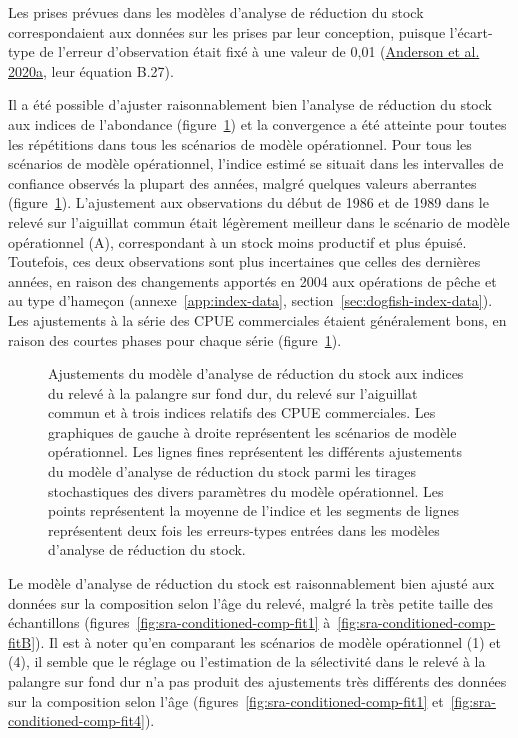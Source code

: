 \documentclass[11pt]{book}
\begin{document}
Les prises prévues dans les modèles d'analyse de réduction du stock correspondaient aux données sur les prises par leur conception, puisque l'écart-type de l'erreur d'observation était fixé à une valeur de 0,01 (\protect\hyperlink{ref-anderson2020gfmp}{Anderson et al. 2020a}, leur équation B.27).

Il a été possible d'ajuster raisonnablement bien l'analyse de réduction du stock aux indices de l'abondance (figure~\ref{fig:survey-fits}) et la convergence a été atteinte pour toutes les répétitions dans tous les scénarios de modèle opérationnel. Pour tous les scénarios de modèle opérationnel, l'indice estimé se situait dans les intervalles de confiance observés la plupart des années, malgré quelques valeurs aberrantes (figure~\ref{fig:survey-fits}). L'ajustement aux observations du début de 1986 et de 1989 dans le relevé sur l'aiguillat commun était légèrement meilleur dans le scénario de modèle opérationnel (A), correspondant à un stock moins productif et plus épuisé. Toutefois, ces deux observations sont plus incertaines que celles des dernières années, en raison des changements apportés en 2004 aux opérations de pêche et au type d'hameçon (annexe~\ref{app:index-data}, section~\ref{sec:dogfish-index-data}). Les ajustements à la série des CPUE commerciales étaient généralement bons, en raison des courtes phases pour chaque série (figure~\ref{fig:survey-fits}).


\begin{figure}[htb]

{\centering {} 

}

\caption{Ajustements du modèle d'analyse de réduction du stock aux indices du relevé à la palangre sur fond dur, du relevé sur l'aiguillat commun et à trois indices relatifs des CPUE commerciales. Les graphiques de gauche à droite représentent les scénarios de modèle opérationnel. Les lignes fines représentent les différents ajustements du modèle d'analyse de réduction du stock parmi les tirages stochastiques des divers paramètres du modèle opérationnel. Les points représentent la moyenne de l'indice et les segments de lignes représentent deux fois les erreurs-types entrées dans les modèles d'analyse de réduction du stock.}\label{fig:survey-fits}
\end{figure}
Le modèle d'analyse de réduction du stock est raisonnablement bien ajusté aux données sur la composition selon l'âge du relevé, malgré la très petite taille des échantillons (figures~\ref{fig:sra-conditioned-comp-fit1} à~\ref{fig:sra-conditioned-comp-fitB}). Il est à noter qu'en comparant les scénarios de modèle opérationnel (1) et (4), il semble que le réglage ou l'estimation de la sélectivité dans le relevé à la palangre sur fond dur n'a pas produit des ajustements très différents des données sur la composition selon l'âge (figures~\ref{fig:sra-conditioned-comp-fit1} et~\ref{fig:sra-conditioned-comp-fit4}).
\end{document}
